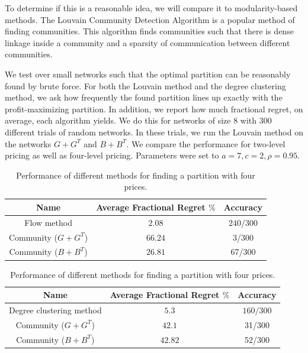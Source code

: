 To determine if this is a reasonable idea, we will compare it to modularity-based methods. The Louvain Community Detection Algorithm is a popular method of finding communities. This algorithm finds communities such that there is dense linkage inside a community and a sparsity of communication between different communities. 

We test over small networks such that the optimal partition can be reasonably found by brute force. For both the Louvain method and the degree clustering method, we ask how frequently the found partition lines up exactly with the profit-maximizing partition. In addition, we report how much fractional regret, on average, each algorithm yields. We do this for networks of size 8 with 300 different trials of random networks. In these trials, we run the Louvain method on the networks $G+G^T$ and $B+B^T$. We compare the performance for two-level pricing as well as four-level pricing. Parameters were set to $a=7,c=2, \rho=0.95$.


\begin{table}
    \centering
    \begin{tabular}{ccc}
        \toprule
        Name & Average Fractional Regret $\%$ & Accuracy \\
        \midrule
        Flow method &   $2.08$ &  $240/300$ \\
        Community ($G+G^T$) & $66.24$ & 3/300 \\
        Community ($B+B^T$) & $26.81$ &   67/300\\
        \bottomrule
    \end{tabular}
    \caption{Performance of different methods for finding a partition with two prices.}
    \begin{tabular}{ccc}
        \toprule
        Name & Average Fractional Regret $\%$ & Accuracy \\
        \midrule 
        Degree clustering method &   $5.3$ &  $160/300$ \\
        Community ($G+G^T$) & $42.1$ & 31/300 \\
        Community ($B+B^T$) & $42.82$ &   52/300 \\
        \bottomrule 
    \end{tabular}
    \caption{Performance of different methods for finding a partition with four prices.}
\end{table}\label{tab:placeholder}




